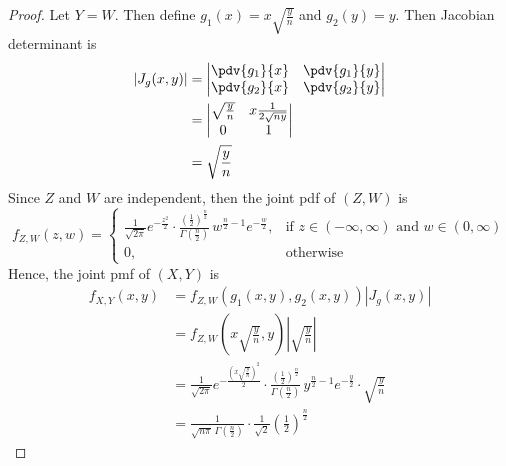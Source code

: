 \documentclass[hwnumber=4,studentnumber=20053722]{mthe353answer}
\begin{document}
  \begin{questions}
    \setcounter{question}{3}
    \question{}
    \begin{solution}
      \begin{proof}
        Let \(Y = W\). Then define \(g_1(x) = x \sqrt{\frac{y}{n}}\) and \(g_2(y)
        = y\). Then Jacobian determinant is
        \begin{align*}
          \left|J_g(x,y)\right| &= \begin{vmatrix}
            \pdv{g_1}{x} & \pdv{g_1}{y}\\
            \pdv{g_2}{x} & \pdv{g_2}{y}
          \end{vmatrix}\\
          &= \begin{vmatrix}
            \sqrt{\frac{y}{n}} & x\frac{1}{2\sqrt{ny}}\\
            0 & 1
          \end{vmatrix}\\
          &= \sqrt{\frac{y}{n}}
        \end{align*}
        Since \(Z\) and \(W\) are independent, then the joint pdf of \((Z,W)\)
        is
        \begin{equation*}
          f_{Z,W}(z,w) = \begin{cases}
            \frac{1}{\sqrt{2\pi}}e^{-\frac{z^2}{2}} \cdot \frac{\left(\frac{1}{2}\right)
              ^{\frac{n}{2}}}{\Gamma\left(\frac{n}{2}\right)}\, w^{\frac{n}{2}-1}
              e^{-\frac{w}{2}}, & \text{if } z \in (-\infty,\infty) \text{ and }
              w \in (0,\infty)\\
            0, & \text{otherwise}
          \end{cases}
        \end{equation*}
        Hence, the joint pmf of \((X,Y)\) is
        \begin{align*}
          f_{X,Y}(x,y) &= f_{Z,W}(g_1(x,y),g_2(x,y))\left|J_g(x,y)\right|\\
          &= f_{Z,W}\left(x \sqrt{\frac{y}{n}},y\right) \left|\sqrt{\frac{y}{n}}\right|\\
          &= \frac{1}{\sqrt{2\pi}}
            e^{-\frac{\left(x \sqrt{\frac{y}{n}}\right)^2}{2}}
            \cdot \frac{\left(\frac{1}{2}\right)
            ^{\frac{n}{2}}}{\Gamma\left(\frac{n}{2}\right)}\,y^{\frac{n}{2}-1}
            e^{-\frac{y}{2}}
            \cdot \sqrt{\frac{y}{n}}\\
          &= \frac{1}{\sqrt{n\pi}\,\Gamma\left(\frac{n}{2}\right)}
            \cdot \frac{1}{\sqrt{2}} \left(\frac{1}{2}\right)^{\frac{n}{2}}

\end{align*}
\end{proof}
\end{solution}
\end{questions}
\end{document}
